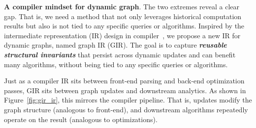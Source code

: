 


\textbf{A compiler mindset for dynamic graph}.
The two extremes reveal a clear gap.
That is, we need a method that not only leverages historical computation results but also is not tied to any specific queries or algorithms.
Inspired by the intermediate representation (IR) design in compiler~\cite{Lattner2004LLVM}, we propose a new  IR for dynamic graphs, named graph IR (GIR).
The goal is to capture \textbf{\textit{reusable structural invariants}} that persist across dynamic updates and can benefit many algorithms, without being tied to any specific queries or algorithms.

Just as a compiler IR sits between front-end parsing and back-end optimization passes, GIR sits between graph updates and downstream analytics.
As shown in Figure~\ref{fig:gir_ir}, this mirrors the compiler
pipeline. That is, updates modify the graph structure (analogous to front-end), 
and downstream algorithms repeatedly operate on the result
(analogous to optimizations).



